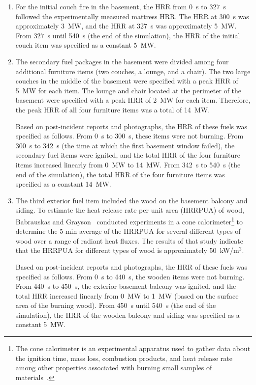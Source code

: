 \documentclass[12pt,oneside]{book}
\begin{document}
\begin{enumerate}
\item For the initial couch fire in the basement, the HRR from 0~s to 327~s followed the experimentally measured mattress HRR. The HRR at 300~s was approximately 3~MW, and the HRR at 327~s was approximately 5~MW. From 327~s until 540~s (the end of the simulation), the HRR of the initial couch item was specified as a constant 5~MW.

\item The secondary fuel packages in the basement were divided among four additional furniture items (two couches, a lounge, and a chair). The two large couches in the middle of the basement were specified with a peak HRR of 5~MW for each item. The lounge and chair located at the perimeter of the basement were specified with a peak HRR of 2~MW for each item. Therefore, the peak HRR of all four furniture items was a total of 14~MW.

Based on post-incident reports and photographs, the HRR of these fuels was specified as follows. From 0~s to 300~s, these items were not burning. From 300~s to 342~s (the time at which the first basement window failed), the secondary fuel items were ignited, and the total HRR of the four furniture items increased linearly from 0~MW to 14~MW. From 342~s to 540~s (the end of the simulation), the total HRR of the four furniture items was specified as a constant 14~MW.

\item The third exterior fuel item included the wood on the basement balcony and siding. To estimate the heat release rate per unit area (HRRPUA) of wood, Babrauskas and Grayson~\cite{babrauskas1990} conducted experiments in a cone calorimeter\footnote{The cone calorimeter is an experimental apparatus used to gather data about the ignition time, mass loss, combustion products, and heat release rate among other properties associated with burning small samples of materials~\cite{ASTM:E1355}.} to determine the 5-min average of the HRRPUA for several different types of wood over a range of radiant heat fluxes. The results of that study indicate that the HRRPUA for different types of wood is approximately 50~kW/m$^2$.

Based on post-incident reports and photographs, the HRR of these fuels was specified as follows. From 0~s to 440~s, the wooden items were not burning. From 440~s to 450~s, the exterior basement balcony was ignited, and the total HRR increased linearly from 0~MW to 1~MW (based on the surface area of the burning wood). From 450~s until 540~s (the end of the simulation), the HRR of the wooden balcony and siding was specified as a constant 5~MW.
\end{enumerate}
\end{document}
